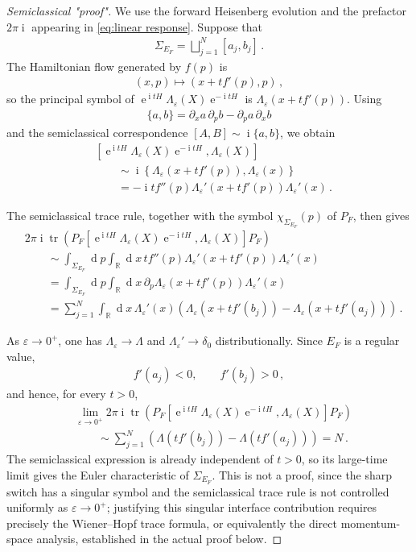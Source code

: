 \documentclass[a4paper,10pt]{article}
\numberwithin{equation}{section}
\theoremstyle{plain}
\theoremstyle{plain}
\theoremstyle{plain}
\theoremstyle{plain}
\theoremstyle{plain}
\theoremstyle{remark}
\theoremstyle{definition}
\theoremstyle{plain}
\newcommand{\ee}{\operatorname{e}}
\newcommand{\ii}{\operatorname{i}}
\newcommand{\RR}{\mathbb{R}}
\newcommand{\dif}{\operatorname{d}\!} %
\newcommand{\tr}{\operatorname{tr}}
\newcommand{\ve}{\varepsilon}
\newcommand{\eq}[1]{\begin{align*}#1\end{align*}}
\begin{document}
\begin{proof}[Semiclassical "proof"]
We use the forward Heisenberg evolution and the prefactor $2\pi\ii$ appearing in \cref{eq:linear response}.  Suppose that
\eq{\Sigma_{E_F}=\bigsqcup_{j=1}^{N}[a_j,b_j]\,.}
The Hamiltonian flow generated by $f(p)$ is
\eq{(x,p)\longmapsto\left(x+t f'(p),p\right)\,,}
so the principal symbol of
$\ee^{\ii tH}\Lambda_\ve(X)\ee^{-\ii tH}$ is
$\Lambda_\ve(x+t f'(p))$.  Using
\eq{\{a,b\}=\partial_xa\,\partial_pb-\partial_pa\,\partial_xb}
and the semiclassical correspondence $[A,B]\sim\ii\{a,b\}$, we obtain
\eq{&
\left[\ee^{\ii tH}\Lambda_\ve(X)\ee^{-\ii tH},
\Lambda_\ve(X)\right]\\
&\qquad\sim
\ii\left\{\Lambda_\ve(x+t f'(p)),\Lambda_\ve(x)\right\}\\
&\qquad=
-\ii t f''(p)\Lambda_\ve'(x+t f'(p))\Lambda_\ve'(x)\,.}

The semiclassical trace rule, together with the symbol
$\chi_{\Sigma_{E_F}}(p)$ of $P_F$, then gives
\eq{&
2\pi\ii\tr\left(
P_F\left[
\ee^{\ii tH}\Lambda_\ve(X)\ee^{-\ii tH},
\Lambda_\ve(X)
\right]P_F
\right)\\
&\qquad\sim
\int_{\Sigma_{E_F}}\dif{p}\int_{\RR}\dif{x}\,
t f''(p)\Lambda_\ve'(x+t f'(p))\Lambda_\ve'(x)\\
&\qquad=
\int_{\Sigma_{E_F}}\dif{p}\int_{\RR}\dif{x}\,
\partial_p\Lambda_\ve(x+t f'(p))\Lambda_\ve'(x)\\
&\qquad=
\sum_{j=1}^{N}\int_{\RR}\dif{x}\,\Lambda_\ve'(x)
\left(
\Lambda_\ve(x+t f'(b_j))
-\Lambda_\ve(x+t f'(a_j))
\right)\,.}

As $\ve\to0^+$, one has
$\Lambda_\ve\to\Lambda$ and
$\Lambda_\ve'\to\delta_0$ distributionally.  Since $E_F$ is a regular value,
\eq{f'(a_j)<0,\qquad f'(b_j)>0\,,}
and hence, for every $t>0$,
\eq{&
\lim_{\ve\to0^+}
2\pi\ii\tr\left(
P_F\left[
\ee^{\ii tH}\Lambda_\ve(X)\ee^{-\ii tH},
\Lambda_\ve(X)
\right]P_F
\right)\\
&\qquad\sim
\sum_{j=1}^{N}
\left(
\Lambda(t f'(b_j))-\Lambda(t f'(a_j))
\right)
=N\,.}
The semiclassical expression is already independent of $t>0$, so its
large-time limit gives the Euler characteristic of $\Sigma_{E_F}$.
This is not a proof, since the sharp switch has a singular symbol and the
semiclassical trace rule is not controlled uniformly as $\ve\to0^+$;
justifying this singular interface contribution requires precisely the
Wiener--Hopf trace formula, or equivalently the direct momentum-space
analysis, established in the actual proof below.
\end{proof}
\end{document}
